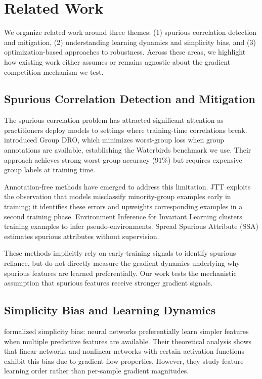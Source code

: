 \section{Related Work}

We organize related work around three themes: (1) spurious correlation detection and mitigation, (2) understanding learning dynamics and simplicity bias, and (3) optimization-based approaches to robustness. Across these areas, we highlight how existing work either assumes or remains agnostic about the gradient competition mechanism we test.

\subsection{Spurious Correlation Detection and Mitigation}

The spurious correlation problem has attracted significant attention as practitioners deploy models to settings where training-time correlations break. \citet{sagawa2020distributionally} introduced Group DRO, which minimizes worst-group loss when group annotations are available, establishing the Waterbirds benchmark we use. Their approach achieves strong worst-group accuracy (91\%) but requires expensive group labels at training time.

Annotation-free methods have emerged to address this limitation. JTT \citep{liu2021just} exploits the observation that models misclassify minority-group examples early in training; it identifies these errors and upweights corresponding examples in a second training phase. Environment Inference for Invariant Learning \citep{creager2021environment} clusters training examples to infer pseudo-environments. Spread Spurious Attribute (SSA) \citep{nam2022spread} estimates spurious attributes without supervision.

These methods implicitly rely on early-training signals to identify spurious reliance, but do not directly measure the gradient dynamics underlying why spurious features are learned preferentially. Our work tests the mechanistic assumption that spurious features receive stronger gradient signals.

\subsection{Simplicity Bias and Learning Dynamics}

\citet{shah2020pitfalls} formalized simplicity bias: neural networks preferentially learn simpler features when multiple predictive features are available. Their theoretical analysis shows that linear networks and nonlinear networks with certain activation functions exhibit this bias due to gradient flow properties. However, they study feature learning order rather than per-sample gradient magnitudes.

